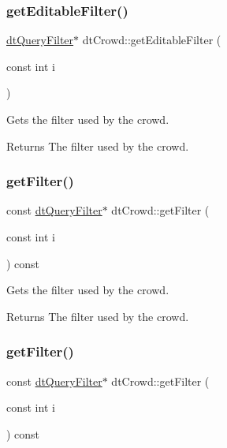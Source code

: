 \subsubsection{\texorpdfstring{get\+Editable\+Filter()}{getEditableFilter()}\hspace{0.1cm}{\footnotesize\ttfamily [2/2]}}
{\footnotesize\ttfamily \hyperlink{classdtQueryFilter}{dt\+Query\+Filter}$\ast$ dt\+Crowd\+::get\+Editable\+Filter (\begin{DoxyParamCaption}\item[{const int}]{i }\end{DoxyParamCaption})\hspace{0.3cm}{\ttfamily [inline]}}

Gets the filter used by the crowd. \begin{DoxyReturn}{Returns}
The filter used by the crowd. 
\end{DoxyReturn}
\mbox{\label{classdtCrowd_ae712fb6e6e907454ec0a827d11957373}} 
\subsubsection{\texorpdfstring{get\+Filter()}{getFilter()}\hspace{0.1cm}{\footnotesize\ttfamily [1/2]}}
{\footnotesize\ttfamily const \hyperlink{classdtQueryFilter}{dt\+Query\+Filter}$\ast$ dt\+Crowd\+::get\+Filter (\begin{DoxyParamCaption}\item[{const int}]{i }\end{DoxyParamCaption}) const\hspace{0.3cm}{\ttfamily [inline]}}

Gets the filter used by the crowd. \begin{DoxyReturn}{Returns}
The filter used by the crowd. 
\end{DoxyReturn}
\mbox{\label{classdtCrowd_ae712fb6e6e907454ec0a827d11957373}} 
\subsubsection{\texorpdfstring{get\+Filter()}{getFilter()}\hspace{0.1cm}{\footnotesize\ttfamily [2/2]}}
{\footnotesize\ttfamily const \hyperlink{classdtQueryFilter}{dt\+Query\+Filter}$\ast$ dt\+Crowd\+::get\+Filter (\begin{DoxyParamCaption}\item[{const int}]{i }\end{DoxyParamCaption}) const\hspace{0.3cm}{\ttfamily [inline]}}

